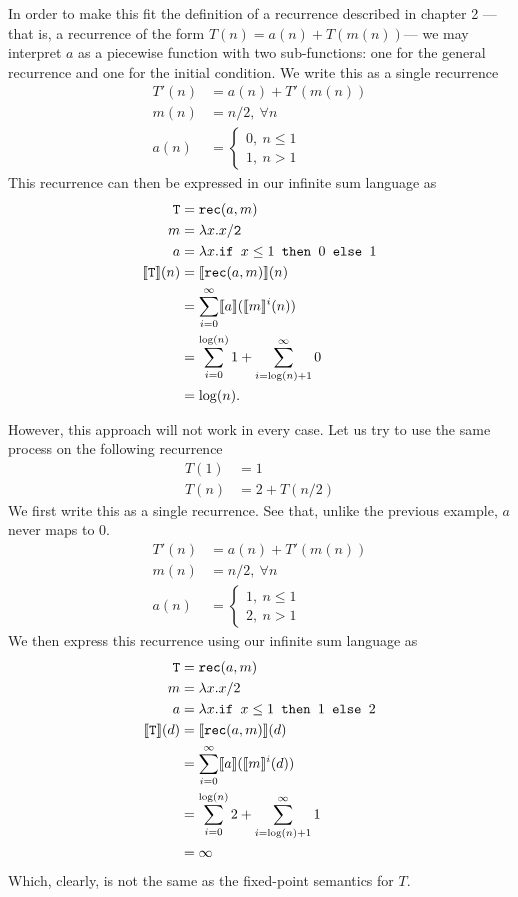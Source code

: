  In order to make this fit the definition of a recurrence described in 
chapter 2 --- that is, a recurrence of the form $T(n) = a(n) + T(m(n))$--- we may interpret $a$ as a 
piecewise function with two sub-functions: one for the general recurrence and one for the initial condition.
We write this as a single recurrence
\begin{align*}
T'(n) &= a(n) + T'(m(n)) \\
m(n) &= n/2, \ \forall n \\ 
a(n) &=
\begin{cases} 
0, \ n \leq 1 \\
1, \ n > 1
\end{cases}
\end{align*} 
This recurrence can then be expressed in our infinite sum language as 
\begin{align*}
\texttt{T} &= \texttt{rec}(a,m) \\
m &= \lambda x.x/\texttt{2} \\
a &= \lambda x.\texttt{if } x\leq 1 \texttt{ then } 0 \texttt{ else } 1 \\
\llbracket \texttt{T} \rrbracket(n) &= \llbracket \texttt{rec}(a,m) \rrbracket(n) \\
&= \sum_{i=0}^{\infty}\llbracket a \rrbracket(\llbracket m\rrbracket^i(n)) \\
&= \sum_{i=0}^{\log(n)} 1 + \sum_{i=\log(n)+1}^{\infty} 0 \\
&= \log(n).
\end{align*}

However, this approach will not work in every case. Let us try to use the same process on the following recurrence
\begin{align*}
T(1) &= 1 \\
T(n) &= 2 + T(n/2) 
\end{align*}
We first write this as a single recurrence. See that, unlike the previous example, $a$ never maps to $0$.
\begin{align*}
T'(n) &= a(n) + T'(m(n)) \\
m(n) &= n/2, \ \forall n \\ 
a(n) &= 
\begin{cases}
1, \ n \leq 1 \\
2, \ n > 1
\end{cases}
\end{align*}
We then express this recurrence using our infinite sum language as
\begin{align*}
\texttt{T} &= \texttt{rec}(a,m) \\
m &= \lambda x.x/2 \\
a &=\lambda x.\texttt{if } x\leq1 \texttt{ then } 1 \texttt{ else } 2 \\
\llbracket \texttt{T} \rrbracket(d) &= \llbracket \texttt{rec}(a,m) \rrbracket(d) \\
&= \sum_{i=0}^{\infty}\llbracket a \rrbracket(\llbracket m\rrbracket^i(d)) \\
&= \sum_{i=0}^{\log(n)} 2 + \sum_{i=\log(n)+1 }^{\infty} 1 \\
&= \infty
\end{align*}
Which, clearly, is not the same as the fixed-point semantics for $T$.

